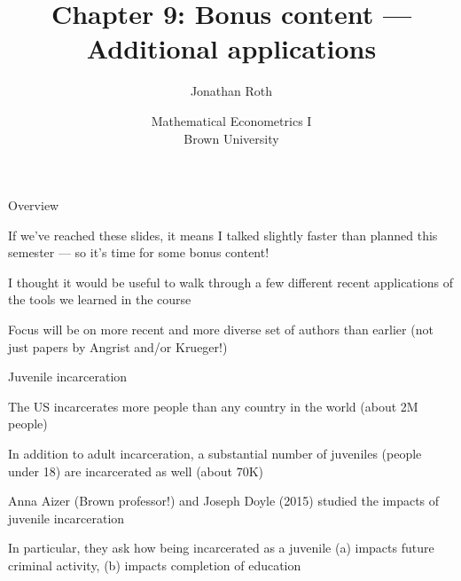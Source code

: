 \documentclass[11pt,english,handout]{beamer}
\newenvironment{wideitemize}{\itemize\addtolength{\itemsep}{10pt}}{\enditemize}
\begin{document}
	
	\begin{frame}[noframenumbering]{}
		\vspace{0.5cm}
		\title[]{Chapter 9: Bonus content --- Additional applications}
		\author{Jonathan Roth}
		\date{Mathematical Econometrics I \\ Brown University\\} 
		\titlepage {\small{}\ }\thispagestyle{empty} \vspace{-30pt}
		
	\end{frame}


	\begin{frame}{Overview}
		\begin{wideitemize}
			\item
			If we've reached these slides, it means I talked slightly faster than planned this semester --- so it's time for some bonus content!
			
			\item
			I thought it would be useful to walk through a few different recent applications of the tools we learned in the course
			
			\item
			Focus will be on more recent and more diverse set of authors than earlier (not just papers by Angrist and/or Krueger!)
		\end{wideitemize}
	\end{frame}	


	\begin{frame}{Juvenile incarceration}
		\begin{wideitemize}
			\item
			The US incarcerates more people than any country in the world (about 2M people)
			
			\item
			In addition to adult incarceration, a substantial number of juveniles (people under 18) are incarcerated as well (about 70K)
			
			\item
			Anna Aizer (Brown professor!) and Joseph Doyle (2015) studied the impacts of juvenile incarceration
			
			\item
			In particular, they ask how being incarcerated as a juvenile (a) impacts future criminal activity, (b) impacts completion of education
			
		\end{wideitemize}
	\end{frame}
\end{document}
